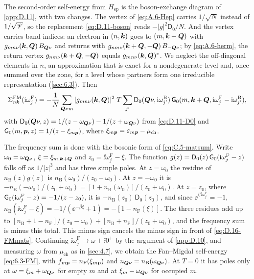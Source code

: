 The second-order self-energy from $H_{\mathrm{ep}}$ is the boson-exchange diagram of \cref{app:D.11}, with two changes. The vertex of \cref{eq:A.6-Hep} carries $1/\sqrt N$ instead of $1/\sqrt {\mathscr{V}}$, so the replacement \cref{eq:D.11-boson} reads $-|g|^2\mathsf{D}_0/N$. And the vertex carries band indices: an electron in $(n,\bm{k})$ goes to $(m,\bm{k}+\bm{Q})$ with $g_{mn\nu}(\bm{k},\bm{Q})\,B_{\bm{Q}\nu}$ and returns with $g_{nm\nu}(\bm{k}+\bm{Q},-\bm{Q})\,B_{-\bm{Q}\nu}$; by \cref{eq:A.6-herm}, the return vertex $g_{nm\nu}(\bm{k}+\bm{Q},-\bm{Q})$ equals $g_{mn\nu}(\bm{k},\bm{Q})^*$. We neglect the off-diagonal elements in $n$, an approximation that is exact for a nondegenerate level and, once summed over the zone, for a level whose partners form one irreducible representation (\cref{sec:6.3}). Then
\begin{equation}
  \Sigma^{\mathrm{FM}}_{n\bm{k}}(\mathrm{i}\omega^{\mathrm{F}}_j) = -\frac1N\sum_{\bm{Q}\nu m}|g_{mn\nu}(\bm{k},\bm{Q})|^2\;T\sum_{j'}\mathsf{D}_0(\bm{Q}\nu,\mathrm{i}\omega^{\mathrm{B}}_{j'})\,\mathsf{G}_0(m,\bm{k}+\bm{Q},\mathrm{i}\omega^{\mathrm{F}}_j - \mathrm{i}\omega^{\mathrm{B}}_{j'}) ,
  \label{eq:D.16-FMmats}
\end{equation}
with $\mathsf{D}_0(\bm{Q}\nu,z) = 1/(z - \omega_{\bm{Q}\nu}) - 1/(z + \omega_{\bm{Q}\nu})$ from \cref{eq:D.11-D0} and $\mathsf{G}_0(m,\bm{p},z) = 1/(z - \xi_{m\bm{p}})$, where $\xi_{m\bm{p}} = \varepsilon_{m\bm{p}} - \mu_{\mathrm{ch}}$.

The frequency sum is done with the bosonic form of \cref{eq:C.5-matsum}. Write $\omega_0 = \omega_{\bm{Q}\nu}$, $\xi = \xi_{m,\bm{k}+\bm{Q}}$ and $z_0 = \ii\omega^{\mathrm{F}}_j - \xi$. The function $g(z) = \mathsf{D}_0(z)\,\mathsf{G}_0(\mathrm{i}\omega^{\mathrm{F}}_j - z)$ falls off as $1/|z|^3$ and has three simple poles. At $z = \omega_0$ the residue of $n_{\mathrm{B}}(z)g(z)$ is $n_{\mathrm{B}}(\omega_0)/(z_0 - \omega_0)$. At $z = -\omega_0$ it is $-n_{\mathrm{B}}(-\omega_0)/(z_0 + \omega_0) = [1 + n_{\mathrm{B}}(\omega_0)]/(z_0 + \omega_0)$. At $z = z_0$, where $\mathsf{G}_0(\mathrm{i}\omega^{\mathrm{F}}_j - z) = -1/(z - z_0)$, it is $-n_{\mathrm{B}}(z_0)\,\mathsf{D}_0(z_0)$, and since $\ee^{\ii\beta\omega^{\mathrm{F}}_j} = -1$, $n_{\mathrm{B}}(\ii\omega^{\mathrm{F}}_j - \xi) = -1/(\ee^{-\beta\xi} + 1) = -[1 - n_{\mathrm{F}}(\xi)]$. The three residues add up to $[n_{\mathrm{B}} + 1 - n_{\mathrm{F}}]/(z_0 - \omega_0) + [n_{\mathrm{B}} + n_{\mathrm{F}}]/(z_0 + \omega_0)$, and the frequency sum is minus this total. This minus sign cancels the minus sign in front of \cref{eq:D.16-FMmats}. Continuing $\ii\omega^{\mathrm{F}}_j \to \omega + \ii0^+$ by the argument of \cref{app:D.10}, and measuring $\omega$ from $\mu_{\mathrm{ch}}$ as in \cref{sec:4.7}, we obtain the Fan--Migdal self-energy \cref{eq:6.3-FM}, with $f_{m\bm{p}} = n_{\mathrm{F}}(\xi_{m\bm{p}})$ and $n_{\bm{Q}\nu} = n_{\mathrm{B}}(\omega_{\bm{Q}\nu})$. At $T = 0$ it has poles only at $\omega = \xi_m + \omega_{\bm{Q}\nu}$ for empty $m$ and at $\xi_m - \omega_{\bm{Q}\nu}$ for occupied $m$.

